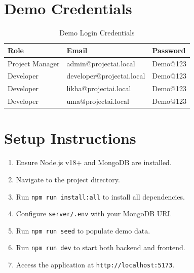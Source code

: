 \documentclass[12pt,a4paper,oneside]{report}
\begin{document}
\appendix

\chapter{Demo Credentials}

\begin{table}[H]
\centering
\begin{tabular}{|l|l|l|}
\hline
\textbf{Role} & \textbf{Email} & \textbf{Password} \\
\hline
Project Manager & admin@projectai.local & Demo@123 \\
Developer       & developer@projectai.local & Demo@123 \\
Developer       & likha@projectai.local & Demo@123 \\
Developer       & uma@projectai.local & Demo@123 \\
\hline
\end{tabular}
\caption{Demo Login Credentials}
\end{table}

\chapter{Setup Instructions}

\begin{enumerate}
  \item Ensure Node.js v18+ and MongoDB are installed.
  \item Navigate to the project directory.
  \item Run \texttt{npm run install:all} to install all dependencies.
  \item Configure \texttt{server/.env} with your MongoDB URI.
  \item Run \texttt{npm run seed} to populate demo data.
  \item Run \texttt{npm run dev} to start both backend and frontend.
  \item Access the application at \texttt{http://localhost:5173}.
\end{enumerate}
\end{document}
